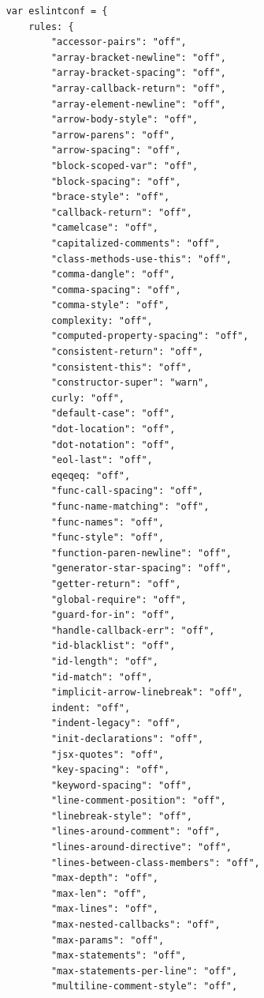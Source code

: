 \begin{figure}[h!]
    \centering

\begin{small}
\begin{verbatim}
    var eslintconf = {
        rules: {
            "accessor-pairs": "off",
            "array-bracket-newline": "off",
            "array-bracket-spacing": "off",
            "array-callback-return": "off",
            "array-element-newline": "off",
            "arrow-body-style": "off",
            "arrow-parens": "off",
            "arrow-spacing": "off",
            "block-scoped-var": "off",
            "block-spacing": "off",
            "brace-style": "off",
            "callback-return": "off",
            "camelcase": "off",
            "capitalized-comments": "off",
            "class-methods-use-this": "off",
            "comma-dangle": "off",
            "comma-spacing": "off",
            "comma-style": "off",
            complexity: "off",
            "computed-property-spacing": "off",
            "consistent-return": "off",
            "consistent-this": "off",
            "constructor-super": "warn",
            curly: "off",
            "default-case": "off",
            "dot-location": "off",
            "dot-notation": "off",
            "eol-last": "off",
            eqeqeq: "off",
            "func-call-spacing": "off",
            "func-name-matching": "off",
            "func-names": "off",
            "func-style": "off",
            "function-paren-newline": "off",
            "generator-star-spacing": "off",
            "getter-return": "off",
            "global-require": "off",
            "guard-for-in": "off",
            "handle-callback-err": "off",
            "id-blacklist": "off",
            "id-length": "off",
            "id-match": "off",
            "implicit-arrow-linebreak": "off",
            indent: "off",
            "indent-legacy": "off",
            "init-declarations": "off",
            "jsx-quotes": "off",
            "key-spacing": "off",
            "keyword-spacing": "off",
            "line-comment-position": "off",
            "linebreak-style": "off",
            "lines-around-comment": "off",
            "lines-around-directive": "off",
            "lines-between-class-members": "off",
            "max-depth": "off",
            "max-len": "off",
            "max-lines": "off",
            "max-nested-callbacks": "off",
            "max-params": "off",
            "max-statements": "off",
            "max-statements-per-line": "off",
            "multiline-comment-style": "off",

\end{verbatim}
\end{small}
\end{figure}
